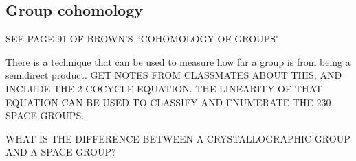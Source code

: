 \documentclass[class=article, crop=false]{standalone}
\begin{document}
\subsection{Group cohomology}
SEE PAGE 91 OF BROWN'S ``COHOMOLOGY OF GROUPS"
\par
There is a technique that can be used to measure how far a group is from being a semidirect product. GET NOTES FROM CLASSMATES ABOUT THIS, AND INCLUDE THE 2-COCYCLE EQUATION. THE LINEARITY OF THAT EQUATION CAN BE USED TO CLASSIFY AND ENUMERATE THE 230 SPACE GROUPS.
\par
WHAT IS THE DIFFERENCE BETWEEN A CRYSTALLOGRAPHIC GROUP AND A SPACE GROUP?
\end{document}
